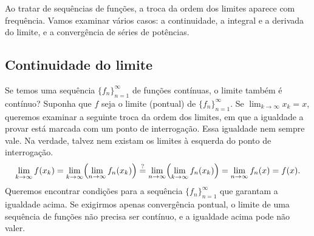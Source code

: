 Ao tratar de sequências de funções, a troca da ordem dos limites aparece
com frequência. Vamos examinar vários casos: a continuidade, a integral e
a derivada do limite, e a convergência de séries de potências.

\subsection{Continuidade do limite}

Se temos uma sequência $\{ f_n \}_{n=1}^\infty$ de funções contínuas,
o limite também é contínuo? Suponha que $f$ seja o limite (pontual) de
$\{ f_n \}_{n=1}^\infty$. Se $\lim_{k\to\infty} x_k = x$, queremos
examinar a seguinte troca da ordem dos limites, em que a igualdade a provar
está marcada com um ponto de interrogação. Essa igualdade nem sempre vale.
Na verdade, talvez nem existam os limites à esquerda do ponto de
interrogação.
\begin{equation*}
\lim_{k \to \infty} 
f(x_k)
=
\lim_{k \to \infty} 
\Bigl(
\lim_{n \to \infty} f_n(x_k)
\Bigr)
\overset{?}{=}
\lim_{n \to \infty}
\Bigl(
\lim_{k \to \infty} 
f_n(x_k)
\Bigr)
=
\lim_{n \to \infty}
f_n(x)
=
f(x) .
\end{equation*}
Queremos encontrar condições para a sequência $\{ f_n \}_{n=1}^\infty$
que garantam a igualdade acima. Se exigirmos apenas convergência pontual,
o limite de uma sequência de funções não precisa ser contínuo, e a igualdade
acima pode não valer.

